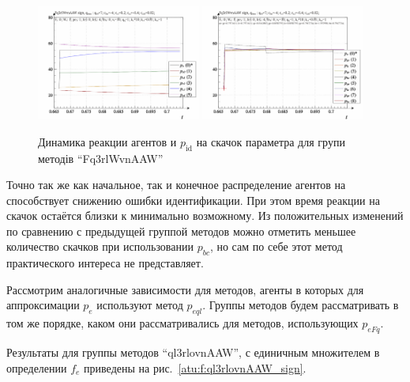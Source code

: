 \begin{figure}[htb!]
  \begin{center}
    \includegraphics[width=0.48\textwidth]{p/sign/qls-p_t_pi_m_Fq3rlWvnAAW_sign.png}
    \hfill
    \includegraphics[width=0.48\textwidth]{p/sign/qls-p_t_p_m_Fq3rlWvnAAW_sign.png}
  \end{center}
  \caption{Динамика реакции агентов и $p_\mathrm{id}$ на скачок параметра для групи методів ``Fq3rlWvnAAW''}
  \label{atu:f:Fq3rlWvnAAW_sign}
\end{figure}

Точно так же как начальное, так и конечное распределение
агентов на способствует снижению ошибки идентификации.
При этом время реакции на скачок остаётся близки к минимально возможному.
Из положительных изменений по сравнению с предыдущей группой методов
можно отметить меньшее количество скачков при использовании $p_{bc}$,
но сам по себе этот метод практического интереса не представляет.



Рассмотрим аналогичные зависимости для методов, агенты в которых
для аппроксимации $p_e$ используют метод $p_{eql}$.
Группы методов будем рассматривать в том же порядке,
каком они рассматривались для методов, использующих $p_{eFq}$.

Результаты для группы методов ``ql3rlovnAAW'',
с единичным множителем в определении $f_e$
приведены на рис.~\ref{atu:f:ql3rlovnAAW_sign}.

